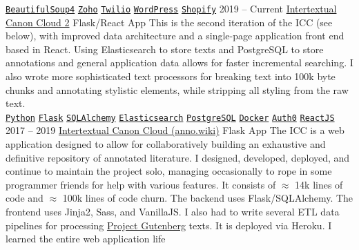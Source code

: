 \documentclass[9pt]{developercv} %
\begin{document}
\begin{entrylist}
{        \texttt{{\href{https://www.crummy.com/software/BeautifulSoup/bs4/doc/}{BeautifulSoup4}}}\slashsep
        \texttt{{\href{https://www.zoho.com/}{Zoho}}}\slashsep
        \texttt{{\href{https://www.twilio.com/}{Twilio}}}\slashsep
        \texttt{{\href{https://wordpress.org/}{WordPress}}}\slashsep
        \texttt{{\href{https://www.shopify.com/}{Shopify}}}
        }
    \entry
        {2019 -- Current}
        {{\href{https://github.com/Anno-Wiki}{Intertextual Canon Cloud 2}}}
        {Flask/React App}
        {
            This is the second iteration of the ICC (see below), with improved
            data architecture and a single-page application front end based in
            React.  Using Elasticsearch to store texts and PostgreSQL to store
            annotations and general application data allows for faster
            incremental searching. I also wrote more sophisticated text
            processors for breaking text into 100k byte chunks and annotating
            stylistic elements, while stripping all styling from the raw text.
        \\
        \texttt{{\href{https://www.python.org/}{Python}}}\slashsep
        \texttt{{\href{https://flask.palletsprojects.com/en/1.1.x/}{Flask}}}\slashsep
        \texttt{{\href{https://www.sqlalchemy.org/}{SQLAlchemy}}}\slashsep
        \texttt{{\href{https://www.elastic.co/}{Elasticsearch}}}\slashsep
        \texttt{{\href{https://www.postgresql.org/}{PostgreSQL}}}\slashsep
        \texttt{{\href{https://www.docker.com/}{Docker}}}\slashsep
        \texttt{{\href{https://auth0.com/}{Auth0}}}\slashsep
        \texttt{{\href{https://reactjs.org/}{ReactJS}}}
        }
    \entry
        {2017 -- 2019}
        {{\href{https://github.com/Anno-Wiki/icc}{Intertextual Canon Cloud (anno.wiki)}}}
        {Flask App}
        {
            The ICC is a web application designed to allow for collaboratively
            building an exhaustive and definitive repository of annotated
            literature. I designed, developed, deployed, and continue to
            maintain the project solo, managing occasionally to rope in some
            programmer friends for help with various features. It consists of
            $\approx$ 14k lines of code and $\approx$ 100k lines of code churn.
            The backend uses Flask/SQLAlchemy. The frontend uses Jinja2, Sass,
            and VanillaJS. I also had to write several ETL data pipelines for
            processing {\href{https://gutenberg.org}{Project Gutenberg}} texts.
            It is deployed via Heroku. I learned the entire web application life
}
\end{entrylist}
\end{document}
